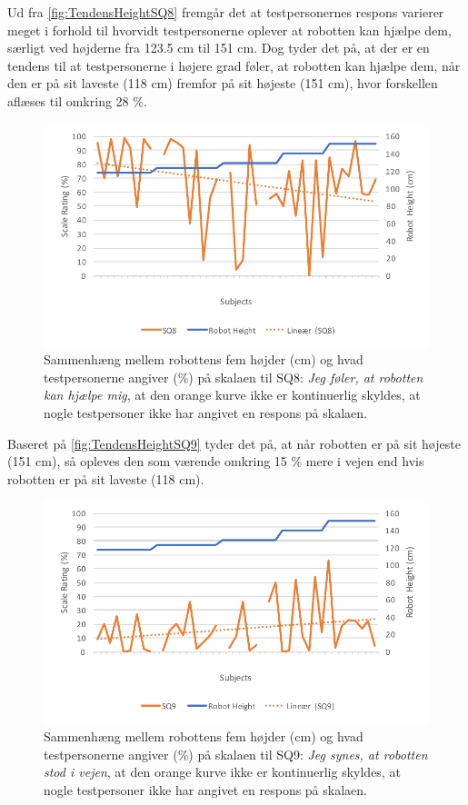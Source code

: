 \noindent
%
Ud fra \autoref{fig:TendensHeightSQ8} fremgår det at testpersonernes respons varierer meget i forhold til hvorvidt testpersonerne oplever at robotten kan hjælpe dem, særligt ved højderne fra 123.5 cm til 151 cm. Dog tyder det på, at der er en tendens til at testpersonerne i højere grad føler, at robotten kan hjælpe dem, når den er på sit laveste (118 cm) fremfor på sit højeste (151 cm), hvor forskellen aflæses til omkring 28 \%.
%
\begin{figure}[H]
\centering
\includegraphics[width=\textwidth]{Figure/DatabehandlingSkalaer/TendensHeight/HeightSQ8}
\caption{Sammenhæng mellem robottens fem højder (cm) og hvad testpersonerne angiver (\%) på skalaen til SQ8: \textit{Jeg føler, at robotten kan hjælpe mig}, at den orange kurve ikke er kontinuerlig skyldes, at nogle testpersoner ikke har angivet en respons på skalaen.}
\label{fig:TendensHeightSQ8}
\end{figure}
\noindent
%
Baseret på \autoref{fig:TendensHeightSQ9} tyder det på, at når robotten er på sit højeste (151 cm), så opleves den som værende omkring 15 \% mere i vejen end hvis robotten er på sit laveste (118 cm). 
%
\begin{figure}[H]
\centering
\includegraphics[width=\textwidth]{Figure/DatabehandlingSkalaer/TendensHeight/HeightSQ9}
\caption{Sammenhæng mellem robottens fem højder (cm) og hvad testpersonerne angiver (\%) på skalaen til SQ9: \textit{Jeg synes, at robotten stod i vejen}, at den orange kurve ikke er kontinuerlig skyldes, at nogle testpersoner ikke har angivet en respons på skalaen.}
\label{fig:TendensHeightSQ9}
\end{figure}
